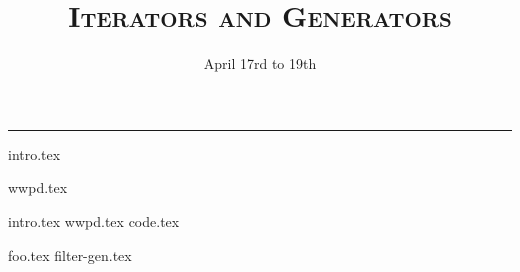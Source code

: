 \documentclass{exam}
\title{\textsc{Iterators and Generators}}
\date{April 17rd to 19th}
\begin{document}
\maketitle
\rule{\textwidth}{0.15em}
\fontsize{12}{15}\selectfont


{intro.tex}
\begin{questions}
{wwpd.tex}

\newpage

{intro.tex}
\newpage
{wwpd.tex}
{code.tex}

\newpage
{foo.tex}
\newpage
{filter-gen.tex}

\end{questions}
\end{document}
